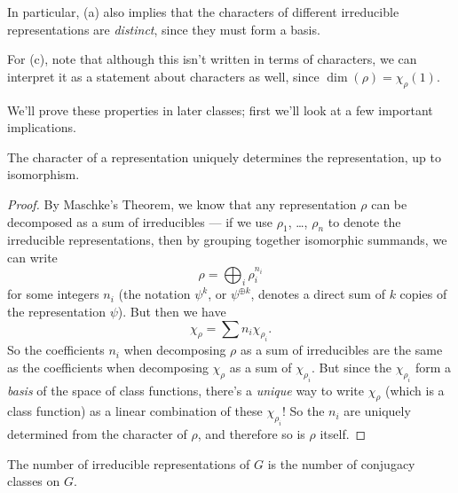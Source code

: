 In particular, (a) also implies that the characters of different irreducible representations are \emph{distinct}, since they must form a basis. 

For (c), note that although this isn't written in terms of characters, we can interpret it as a statement about characters as well, since $\dim(\rho) = \chi_\rho(1)$.

We'll prove these properties in later classes; first we'll look at a few important implications. 

\begin{corollary}
The character of a representation uniquely determines the representation, up to isomorphism. 
\end{corollary}

\begin{proof}
By Maschke's Theorem, we know that any representation $\rho$ can be decomposed as a sum of irreducibles --- if we use $\rho_1$, \ldots, $\rho_n$ to denote the irreducible representations, then by grouping together isomorphic summands, we can write \[\rho = \bigoplus_i \rho_i^{n_i}\] for some integers $n_i$ (the notation $\psi^k$, or $\psi^{\oplus k}$, denotes a direct sum of $k$ copies of the representation $\psi$). But then we have \[\chi_\rho = \sum n_i\chi_{\rho_i}.\] So the coefficients $n_i$ when decomposing $\rho$ as a sum of irreducibles are the same as the coefficients when decomposing $\chi_\rho$ as a sum of $\chi_{\rho_i}$. But since the $\chi_{\rho_i}$ form a \emph{basis} of the space of class functions, there's a \emph{unique} way to write $\chi_\rho$ (which is a class function) as a linear combination of these $\chi_{\rho_i}$! So the $n_i$ are uniquely determined from the character of $\rho$, and therefore so is $\rho$ itself. 
\end{proof}



\begin{corollary}
The number of irreducible representations of $G$ is the number of conjugacy classes on $G$.
\end{corollary}

